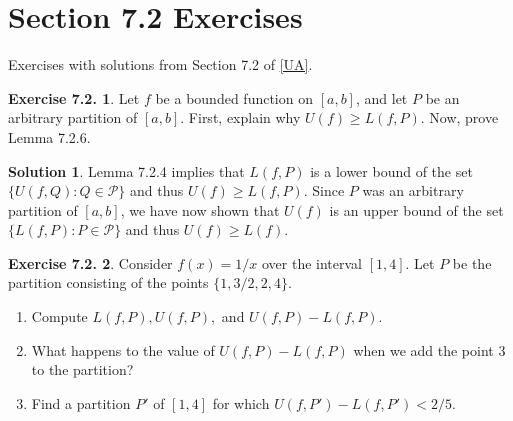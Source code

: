 \documentclass[12pt]{article}
\theoremstyle{definition}
\theoremstyle{exercise}
\newtheorem{exercise}{Exercise 7.2.}
\theoremstyle{solution}
\newtheorem*{solution}{Solution}
\newcommand{\poly}{\mathcal{P}}
\begin{document}
\section{Section 7.2 Exercises}

Exercises with solutions from Section 7.2 of \hyperlink{ua}{[UA]}.

\begin{exercise}
\label{ex:1}
    Let \( f \) be a bounded function on \( [a, b] \), and let \( P \) be an arbitrary partition of \( [a, b] \). First, explain why \( U(f) \geq L(f, P) \). Now, prove Lemma 7.2.6.
\end{exercise}

\begin{solution}
    Lemma 7.2.4 implies that \( L(f, P) \) is a lower bound of the set \( \{ U(f, Q) : Q \in \poly \} \) and thus \( U(f) \geq L(f, P) \). Since \( P \) was an arbitrary partition of \( [a, b] \), we have now shown that \( U(f) \) is an upper bound of the set \( \{ L(f, P) : P \in \poly \} \) and thus \( U(f) \geq L(f) \).
\end{solution}

\begin{exercise}
\label{ex:2}
    Consider \( f(x) = 1/x \) over the interval \( [1, 4] \). Let \( P \) be the partition consisting of the points \( \{ 1, 3/2, 2, 4 \} \).
    \begin{enumerate}
        \item Compute \( L(f, P), U(f, P), \) and \( U(f, P) - L(f, P) \).

        \item What happens to the value of \( U(f, P) - L(f, P) \) when we add the point 3 to the partition?

        \item Find a partition \( P' \) of \( [1, 4] \) for which \( U(f, P') - L(f, P') < 2/5 \).
    \end{enumerate}
\end{exercise}
\end{document}
